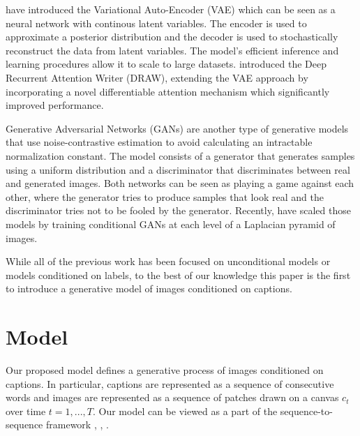 \documentclass{article} %
\newcommand{\icaption}{{\bf{y}}}
\newcommand{\oimage}{{\bf{x}}}
\begin{document}
\cite{kingma_vae} have introduced the Variational Auto-Encoder (VAE) which can be seen as a neural network with continous latent variables. The encoder is used to approximate a posterior distribution and the decoder is used to stochastically reconstruct the data from latent variables. The model's efficient inference and learning procedures allow it to scale to large datasets. 
\cite{gregor_draw} introduced the Deep Recurrent Attention Writer (DRAW), extending the VAE approach by incorporating a novel differentiable attention mechanism which significantly improved performance.%

Generative Adversarial Networks (GANs) \citep{goodfellow_gan} are another type of generative models that use noise-contrastive estimation \citep{gutmann_nce} to avoid calculating an intractable normalization constant. The model consists of a generator that generates samples using a uniform distribution and a discriminator that discriminates between real and generated images. 
Both networks can be seen as playing a game against each other, where the generator tries to produce samples that look real and the discriminator tries not to be fooled by the generator. 
Recently, \cite{denton_lapgan} have scaled those models by training conditional GANs at each level of a Laplacian pyramid of images. 

While all of the previous work has been focused on unconditional models or models conditioned on labels, to the best of our knowledge this paper is the first to introduce a generative model of images conditioned on captions.

\section{Model}
Our proposed model 
defines a generative process of images conditioned on captions. In particular, captions are represented as a sequence of consecutive words and images are represented as a sequence of patches drawn on a canvas $c_t$ over time $t=1,...,T$. Our model can be viewed as a part of the sequence-to-sequence framework \citep{ilya_mt}, \citep{cho_mt}, \citep{nitish_video}.
\end{document}
